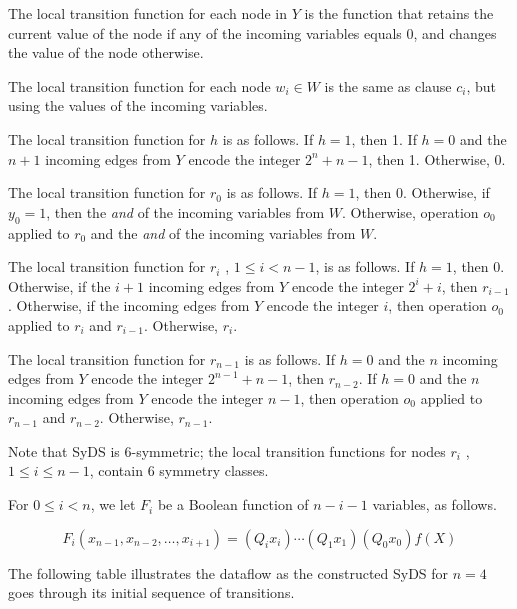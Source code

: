 The local transition function for each node in $Y$ is the function 
that retains the current value of the node if any of the incoming variables equals 0,
and changes the value of the node otherwise.

The local transition function for each node $w_i \in W$ is the same as clause $c_i$,
but using the values of the incoming variables.

The local transition function for $h$ is as follows.
If $h=1$, then 1.
If $h =0$ and  the $n+1$ incoming edges from $Y$ encode the integer $2^n+n-1$, then 1.
Otherwise, $0$.

The local transition function for $r_0$ is as follows.
If $h =1$, then 0.
Otherwise, if $y_0 = 1$, then the {\em and} of the incoming variables from $W$.
Otherwise, operation $o_0$ 
applied to $r_0$ and the {\em and} of the incoming variables from $W$.

The local transition function for $r_i$ , $1 \leq i < n-1$, is as follows.
If $h =1$, then 0.
Otherwise, if the $i+1$ incoming edges from $Y$ encode the integer $2^i+i$, 
then $r_{i-1}$.
Otherwise,  if the incoming edges from $Y$ encode the integer $i$, 
then operation $o_0$ applied to $r_i$ and $r_{i-1}$.
Otherwise, $r_i$.

The local transition function for $r_{n-1}$ is as follows.
If $h=0$ and the $n$ incoming edges from $Y$ encode the integer $2^{n-1}+n-1$, 
then $r_{n-2}$.
If $h =0$ and  the $n$ incoming edges from $Y$ encode the integer $n-1$, 
then operation $o_0$ applied to $r_{n-1}$ and $r_{n-2}$.
Otherwise, $r_{n-1}$.

Note that SyDS \cals{} is 6-symmetric; 
the local transition functions for nodes $r_i$ , $1 \leq i \leq n-1$, contain 6 symmetry classes.

For $0 \leq i < n$, we let $F_i$ be a Boolean function of $n-i-1$ variables, as follows.

$$F_i(x_{n-1}, x_{n-2}, \ldots , x_{i+1}) = (Q_ i x_i) \cdots (Q_1 x_1) (Q_0 x_0) f(X)$$

The following table illustrates the dataflow as the constructed SyDS \cals{}  for $n =4$ goes through
its initial sequence of transitions.


\bigskip

\bigskip

